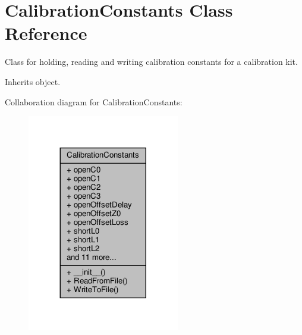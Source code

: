 \hypertarget{classSignalIntegrity_1_1Measurement_1_1CalKit_1_1CalibrationKit_1_1CalibrationConstants}{}\section{Calibration\+Constants Class Reference}
\label{classSignalIntegrity_1_1Measurement_1_1CalKit_1_1CalibrationKit_1_1CalibrationConstants}


Class for holding, reading and writing calibration constants for a calibration kit.  




Inherits object.



Collaboration diagram for Calibration\+Constants\+:
\nopagebreak
\begin{figure}[H]
\begin{center}
\leavevmode
\includegraphics[width=188pt]{classSignalIntegrity_1_1Measurement_1_1CalKit_1_1CalibrationKit_1_1CalibrationConstants__coll__graph}
\end{center}
\end{figure}
